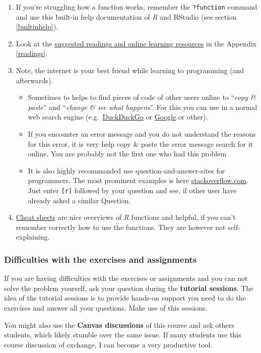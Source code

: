 \documentclass[
]{scrartcl}
\makeatletter
\newenvironment{kframe}{%
\medskip{}
\setlength{\fboxsep}{.8em}
 \def\at@end@of@kframe{}%
 \ifinner\ifhmode%
  \def\at@end@of@kframe{\end{minipage}}%
  \begin{minipage}{\columnwidth}%
 \fi\fi%
 \def\FrameCommand##1{\hskip\@totalleftmargin \hskip-\fboxsep
 \colorbox{shadecolor}{##1}\hskip-\fboxsep
     \hskip-\linewidth \hskip-\@totalleftmargin \hskip\columnwidth}%
 \MakeFramed {\advance\hsize-\width
   \@totalleftmargin\z@ \linewidth\hsize
   \@setminipage}}%
 {\par\unskip\endMakeFramed%
 \at@end@of@kframe}
\newenvironment{rmdblock}[1]
  {
  \begin{itemize}
  \renewcommand{\labelitemi}{
    \raisebox{-.7\height}[0pt][0pt]{
      {\setkeys{Gin}{width=3em,keepaspectratio}\texttt{[image: images/\#1]}}
    }
  }
  \setlength{\fboxsep}{1em}
  \begin{kframe}
  \item
  }
  {
  \end{kframe}
  \end{itemize}
  }
\newenvironment{important}
    {\begin{rmdblock}{hint}}
    {\end{rmdblock}}
\makeatother
\begin{document}
\begin{enumerate}
\def\labelenumi{\arabic{enumi}.}
\item
  If you're struggling how a function works, remember the \texttt{?function} command and use this built-in help documentation of \emph{R} and RStudio (see section \ref{builtinhelp}).
\item
  Look at the \protect\hyperlink{readings}{suggested readings and online learning resources} in the Appendix \ref{readings}.
\item
  Note, the internet is your best friend while learning to programming (and afterwards).

  \begin{itemize}
  \item
    Sometimes to helps to find pieces of code of other users online to ``\emph{copy \& paste}'' and ``\emph{change \& see what happens}''. For this you can use in a normal web search engine (e.g.~\href{https://duckduckgo.com/}{DuckDuckGo} or \href{http://www.google.com/en}{Google} or other).
  \item
    If you encounter an error message and you do not understand the reasons for this error, it is very help copy \& paste the error message search for it online. You are probably not the first one who had this problem
  \item
    It is also highly recommanded use question-and-answer-sites for programmers. The most prominent examples is here \href{https://stackoverflow.com/questions/tagged/r}{stackoverflow.com}. Just enter \texttt{{[}r{]}} followed by your question and see, if other user have already asked a similar Question.
  \end{itemize}
\item
  \protect\hyperlink{cheatsheets}{Cheat sheets} are nice overviews of \emph{R} functions and helpful, if you can't remember correctly how to use the functions. They are however not self-explaining.
\end{enumerate}

\begin{important}
\hypertarget{difficulties-with-the-exercises-and-assignments}{%
\subsubsection*{Difficulties with the exercises and
assignments}\label{difficulties-with-the-exercises-and-assignments}}

If you are having difficulties with the exercises or assignments and you
can not solve the problem yourself, ask your question during the
\textbf{tutorial sessions}. The idea of the tutorial sessions is to
provide hands-on support you need to do the exercises and answer all
your questions. Make use of this sessions.

You might also use the \textbf{Canvas discussions} of this course and
ask others students, which likely stumble over the same issue. If many
students use this course discussion of exchange, I can become a very
productive tool.
\end{important}
\end{document}
